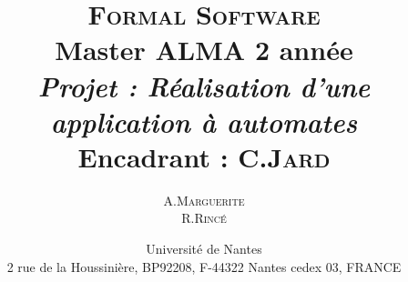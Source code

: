 \documentclass{report}
\title{ {\huge \textsc{Formal Software}} \\Master ALMA 2\up{eme} année \\\vspace{3cm} \emph{Projet : Réalisation d'une application à automates} \\ {\small Encadrant : C.\textsc{Jard}}\vspace{3cm}}
\author{A.\textsc{Marguerite}\\ R.\textsc{Rincé}\vspace{3cm}}
\date{Université de Nantes \\ 2 rue de la Houssinière, BP92208, F-44322 Nantes cedex 03, FRANCE}
\begin{document}
\maketitle
\renewcommand{\labelitemi}{$\bullet$} 

\clearpage

\tableofcontents
\clearpage

%

 

%
%


\listoffigures
%
%
\end{document}
